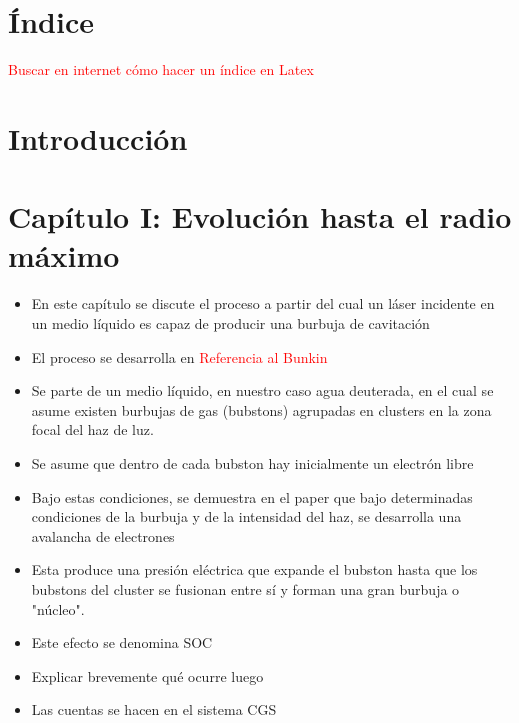 \documentclass[aps,prb,twocolumn,superscriptaddress,floatfix,longbibliography,10pt]{revtex4-2}
\newif\ifptitle
\newif\ifpnumber
\newcounter{para}
\newcommand\ptitle[1]{\par\refstepcounter{para}
{\ifpnumber{\noindent\textcolor{lightgray}{\textbf{\thepara}}\indent}\fi}
{\ifptitle{\textbf{[{#1}]}}\fi}}
\begin{document}
\section*{Índice}
\textcolor{red}{Buscar en internet cómo hacer un índice en Latex}

\section*{Introducción}


















\section*{Capítulo I: Evolución hasta el radio máximo}

\ptitle{Resumen del capítulo}
\begin{itemize}
  \item En este capítulo se discute el proceso a partir del cual un láser incidente en un medio líquido es capaz de producir una burbuja de cavitación
  \item El proceso se desarrolla en \textcolor{red}{Referencia al Bunkin}
  \item Se parte de un medio líquido, en nuestro caso agua deuterada, en el cual se asume existen burbujas de gas (bubstons) agrupadas en clusters en la zona focal del haz de luz. 
  \item Se asume que dentro de cada bubston hay inicialmente un electrón libre
  \item Bajo estas condiciones, se demuestra en el paper que bajo determinadas condiciones de la burbuja y de la intensidad del haz, se desarrolla una avalancha de electrones
  \item Esta produce una presión eléctrica que expande el bubston hasta que los bubstons del cluster se fusionan entre sí y forman una gran burbuja o "núcleo". 
  \item Este efecto se denomina SOC
  \item Explicar brevemente qué ocurre luego
  \item Las cuentas se hacen en el sistema CGS

\end{itemize}
\end{document}
